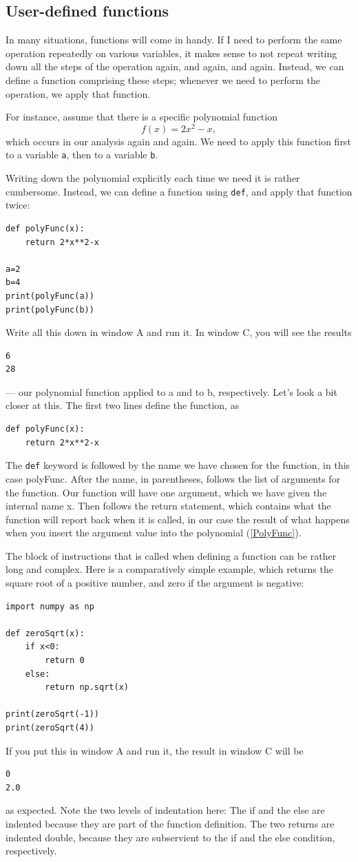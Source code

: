 \documentclass[twocolumn,apj]{openjournal}
\newcommand{\be}{\begin{equation}}
\newcommand{\ee}{\end{equation}}
\begin{document}
\subsection{User-defined functions}
\label{Functions}

In many situations, functions will come in handy. If I need to perform the same operation repeatedly on various variables, it makes sense to not repeat writing down all the steps of the operation again, and again, and again. Instead, we can define a function comprising these steps; whenever we need to perform the operation, we apply that function.

For instance, assume that there is a specific polynomial function
\be
\label{PolyFunc}
f(x) = 2x^2 - x,
\ee
which occurs in our analysis again and again. We need to apply this function first to a variable \verb|a|, then to a variable \verb|b|.

Writing down the polynomial explicitly each time we need it is rather cumbersome. Instead, we can define a function using \verb|def|, and apply that function twice:
\begin{lstlisting}
def polyFunc(x):
	return 2*x**2-x

a=2
b=4
print(polyFunc(a))
print(polyFunc(b))
\end{lstlisting}
Write all this down in window A and run it. In window C, you will see the results 
\begin{lstlisting}
6
28
\end{lstlisting}
--- our polynomial function applied to a and to b, respectively. Let's look a bit closer at this. The first two lines define the function, as
\begin{lstlisting}
def polyFunc(x):
	return 2*x**2-x
\end{lstlisting}
The \verb|def| keyword is followed by the name we have chosen for the function, in this case polyFunc. After the name, in parentheses, follows the list of arguments for the function. Our function will have one argument, which we have given the internal name x. Then follows the return statement, which contains what the function will report back when it is called, in our case the result of what happens when you insert the argument value into the polynomial (\ref{PolyFunc}).

The block of instructions that is called when defining a function can be rather long and complex. Here is a comparatively simple example, which returns the square root of a positive number, and zero if the argument is negative:
\begin{lstlisting}
import numpy as np

def zeroSqrt(x):
	if x<0:
		return 0
	else:
		return np.sqrt(x)
		
print(zeroSqrt(-1))
print(zeroSqrt(4))
\end{lstlisting}
If you put this in window A and run it, the result in window C will be
\begin{lstlisting}
0
2.0
\end{lstlisting}
as expected. Note the two levels of indentation here: The if and the else are indented because they are part of the function definition. The two returns are indented double, because they are subservient to the if and the else condition, respectively.
\end{document}

